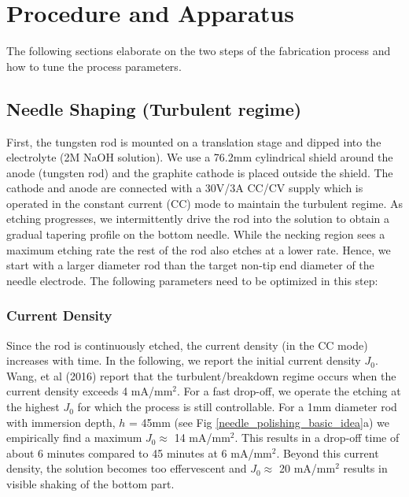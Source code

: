 \documentclass[%
 aip,
 amsmath,amssymb,
 reprint,%
]{revtex4-1}
\begin{document}
\section{\label{sec:level1 Procedure and Apparatus}Procedure and Apparatus}
The following sections elaborate on the two steps of the fabrication process and how to tune the process parameters. 

\subsection{\label{sec:level2}Needle Shaping (Turbulent regime) }
First, the tungsten rod is mounted on a translation stage and dipped into the electrolyte (2M NaOH solution). 
We use a 76.2mm cylindrical shield \cite{Wang2016} around the anode (tungsten rod) and the graphite cathode is placed outside the shield. 
The cathode and anode are connected with a 30V/3A CC/CV supply which is operated in the constant current (CC) mode to maintain the turbulent regime. 
As etching progresses, we intermittently drive the rod into the solution to obtain a gradual tapering profile on the bottom needle.
While the necking region sees a maximum etching rate the rest of the rod also etches at a lower rate.
Hence, we start with a larger diameter rod than the target non-tip end diameter of the needle electrode.
The following parameters need to be optimized in this step:

\subsubsection{Current Density}
Since the rod is continuously etched, the current density (in the CC mode) increases with time.
In the following, we report the initial current density $J_0$.
Wang, et al (2016) \cite{Wang2016} report that the turbulent/breakdown regime occurs when the current density exceeds 4 mA/mm$^2$.
For a fast drop-off, we operate the etching at the highest $J_0$ for which the process is still controllable.
For a 1mm diameter rod with immersion depth, $h$ = 45mm  (see Fig \ref{needle_polishing_basic_idea}a) we empirically find a maximum $J_0 \approx$ 14 mA/mm$^2$.
This results in a drop-off time of about 6 minutes compared to 45 minutes at 6 mA/mm$^2$.
Beyond this current density, the solution becomes too effervescent and  $J_0 \approx$ 20 mA/mm$^2$  results in visible shaking of the bottom part.
\end{document}
